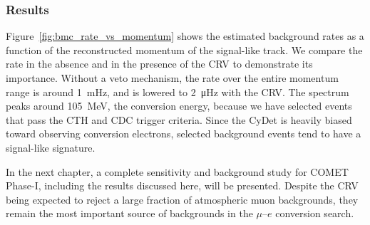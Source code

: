 \subsubsection{Results}
Figure~\ref{fig:bmc_rate_vs_momentum} shows the estimated background rates as a
function of the reconstructed momentum of the signal-like track. We compare the
rate in the absence and in the presence of the CRV to demonstrate its
importance. Without a veto mechanism, the rate over the entire momentum range is
around \SI{1}{\mHz}, and is lowered to \SI{2}{\micro\hertz} with the CRV. The
spectrum peaks around \SI{105}{\MeV}, the conversion energy, because we have
selected events that pass the CTH and CDC trigger criteria. Since the CyDet is
heavily biased toward observing conversion electrons, selected background events
tend to have a signal-like signature.

In the next chapter, a complete sensitivity and background study for COMET
Phase-I, including the results discussed here, will be presented. Despite the
CRV being expected to reject a large fraction of atmospheric muon backgrounds,
they remain the most important source of backgrounds in the $\mu$--$e$
conversion search. 